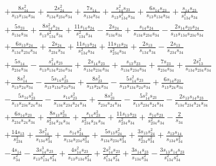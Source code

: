 \begin{align}
  & + \frac{8s_{14}^2}{s_{13}s_{134}s_{34}} + \frac{2s_{24}^2}{s_{134}s_{234}s_{34}} + \frac{7s_{14}}{s_{134}s_{34}} + \frac{s_{14}^2s_{23}}{s_{13}s_{134}^2s_{34}} + \frac{6s_{14}s_{23}}{s_{13}s_{134}s_{34}} + \frac{s_{14}s_{23}}{s_{134}^2s_{34}} \nonumber \\
  & + \frac{5s_{23}}{s_{134}s_{34}} + \frac{8s_{14}^2s_{24}}{s_{13}s_{134}^2s_{34}} + \frac{11s_{14}s_{24}}{s_{134}^2s_{34}} - \frac{2s_{24}}{s_{134}s_{34}} + \frac{s_{14}s_{24}}{s_{134}s_{234}s_{34}} - \frac{2s_{14}s_{23}s_{24}}{s_{13}s_{134}s_{234}s_{34}} \nonumber \\
  & + \frac{6s_{13}s_{24}}{s_{134}s_{234}s_{34}} + \frac{2s_{24}}{s_{234}s_{34}} + \frac{11s_{13}s_{24}}{s_{134}^2s_{34}} + \frac{11s_{13}s_{24}}{s_{234}^2s_{34}} + \frac{2s_{13}}{s_{134}s_{34}} - \frac{2s_{13}}{s_{234}s_{34}} \nonumber \\
  & + \frac{5s_{14}}{s_{234}s_{34}} - \frac{s_{14}^2s_{23}}{s_{13}s_{134}s_{234}s_{34}} + \frac{2s_{14}s_{23}}{s_{134}s_{234}s_{34}} + \frac{s_{13}s_{23}}{s_{134}s_{234}s_{34}} + \frac{7s_{23}}{s_{234}s_{34}} + \frac{2s_{13}^2}{s_{134}s_{234}s_{34}} \nonumber \\
  & + \frac{8s_{14}^2}{s_{13}s_{24}s_{34}} - \frac{5s_{14}s_{23}^2}{s_{13}s_{134}s_{24}s_{34}} + \frac{8s_{23}^2}{s_{13}s_{24}s_{34}} - \frac{5s_{14}^2s_{23}}{s_{13}s_{134}s_{24}s_{34}} + \frac{6s_{14}s_{23}}{s_{13}s_{24}s_{34}} \nonumber \\
  & - \frac{5s_{14}s_{23}^2}{s_{13}s_{234}s_{24}s_{34}} - \frac{s_{14}s_{23}^2}{s_{134}s_{234}s_{24}s_{34}} + \frac{8s_{23}^2}{s_{234}s_{24}s_{34}} - \frac{5s_{14}^2s_{23}}{s_{13}s_{234}s_{24}s_{34}} - \frac{2s_{13}s_{14}s_{23}}{s_{134}s_{234}s_{24}s_{34}} \nonumber \\
  & + \frac{6s_{14}s_{23}}{s_{234}s_{24}s_{34}} + \frac{8s_{13}s_{23}^2}{s_{234}^2s_{24}s_{34}} + \frac{s_{14}s_{23}^2}{s_{234}^2s_{24}s_{34}} + \frac{11s_{13}s_{23}}{s_{234}^2s_{34}} + \frac{s_{14}s_{23}}{s_{234}^2s_{34}} - \frac{2}{s_{34}} \nonumber \\
  & + \frac{14s_{13}}{s_{234}^2} + \frac{3s_{14}^2}{s_{134}s_{34}^2} + \frac{s_{14}s_{24}^2}{s_{134}s_{234}s_{34}^2} + \frac{5s_{13}s_{24}^2}{s_{134}s_{234}s_{34}^2} + \frac{3s_{13}s_{24}^2}{s_{234}^2s_{34}^2} + \frac{s_{13}s_{14}}{s_{134}s_{34}^2} \nonumber \\
  & - \frac{4s_{14}}{s_{34}^2} - \frac{3s_{14}^3s_{23}}{s_{13}s_{134}^2s_{34}^2} + \frac{4s_{14}^2s_{23}}{s_{13}s_{134}s_{34}^2} + \frac{2s_{14}^2s_{23}}{s_{134}^2s_{34}^2} + \frac{3s_{14}s_{23}}{s_{134}s_{34}^2} - \frac{3s_{13}s_{14}s_{23}}{s_{134}^2s_{34}^2} \nonumber \\

\end{align}
